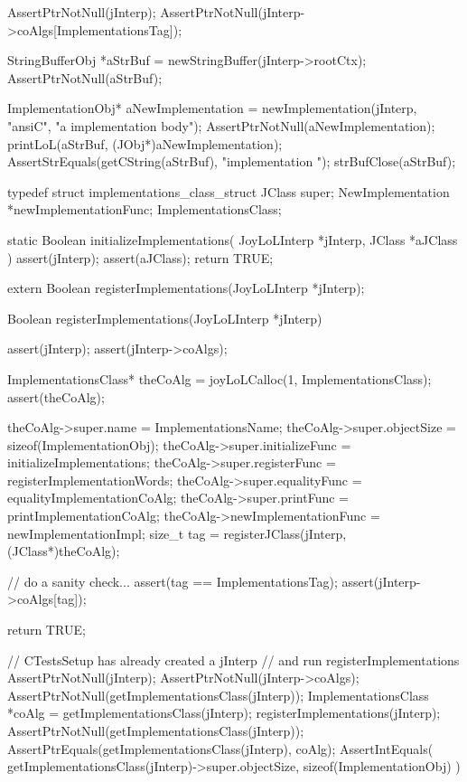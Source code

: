 
\startCTest
  AssertPtrNotNull(jInterp);
  AssertPtrNotNull(jInterp->coAlgs[ImplementationsTag]);

  StringBufferObj *aStrBuf = newStringBuffer(jInterp->rootCtx);
  AssertPtrNotNull(aStrBuf);
  
  ImplementationObj* aNewImplementation =
    newImplementation(jInterp, "ansiC", "a implementation body");
  AssertPtrNotNull(aNewImplementation);
  printLoL(aStrBuf, (JObj*)aNewImplementation);
  AssertStrEquals(getCString(aStrBuf), "implementation ");
  strBufClose(aStrBuf);
\stopCTest
\stopTestCase
\stopTestSuite

\startTestSuite[registerImplementations]

\startCHeader
typedef struct implementations_class_struct {
  JClass       super;
  NewImplementation      *newImplementationFunc;
} ImplementationsClass;

\stopCHeader

\startCCode
static Boolean initializeImplementations(
  JoyLoLInterp *jInterp,
  JClass   *aJClass
) {
  assert(jInterp);
  assert(aJClass);
  return TRUE;
}
\stopCCode

\startCHeader
extern Boolean registerImplementations(JoyLoLInterp *jInterp);
\stopCHeader
{}

\startCCode
Boolean registerImplementations(JoyLoLInterp *jInterp) {
  assert(jInterp);
  assert(jInterp->coAlgs);
  
  ImplementationsClass* theCoAlg
    = joyLoLCalloc(1, ImplementationsClass);
  assert(theCoAlg);
  
  theCoAlg->super.name           = ImplementationsName;
  theCoAlg->super.objectSize     = sizeof(ImplementationObj);
  theCoAlg->super.initializeFunc = initializeImplementations;
  theCoAlg->super.registerFunc   = registerImplementationWords;
  theCoAlg->super.equalityFunc   = equalityImplementationCoAlg;
  theCoAlg->super.printFunc      = printImplementationCoAlg;
  theCoAlg->newImplementationFunc = newImplementationImpl;
  size_t tag =
    registerJClass(jInterp, (JClass*)theCoAlg);
  
  // do a sanity check...
  assert(tag == ImplementationsTag);
  assert(jInterp->coAlgs[tag]);
   
  return TRUE;
}
\stopCCode


\startCTest
  // CTestsSetup has already created a jInterp
  // and run registerImplementations
  AssertPtrNotNull(jInterp);
  AssertPtrNotNull(jInterp->coAlgs);
  AssertPtrNotNull(getImplementationsClass(jInterp));
  ImplementationsClass *coAlg = getImplementationsClass(jInterp);
  registerImplementations(jInterp);
  AssertPtrNotNull(getImplementationsClass(jInterp));
  AssertPtrEquals(getImplementationsClass(jInterp), coAlg);
  AssertIntEquals(
    getImplementationsClass(jInterp)->super.objectSize,
    sizeof(ImplementationObj)
  )
\stopCTest
\stopTestCase
\stopTestSuite
